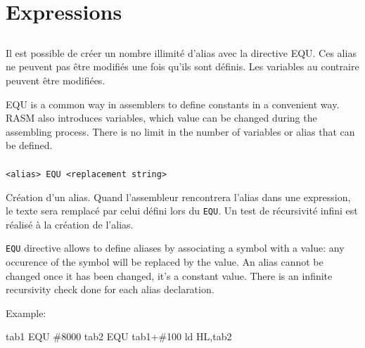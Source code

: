 \section{Expressions}

\subsection{}
\begin{xfr}
Il est possible de créer un nombre illimité d’alias avec la directive EQU.
Ces alias ne peuvent pas être modifiés une fois qu'ils sont définis.
Les variables au contraire peuvent être modifiées.
\end{xfr}

\begin{xen}
EQU is a common way in assemblers to define constants in a convenient way.  
RASM also introduces variables, which value can be changed during the assembling process.
There is no limit in the number of variables or alias that can be defined.
\end{xen}

\subsubsection{}
\begin{verbatim}
<alias> EQU <replacement string>
\end{verbatim}

\begin{xfr}
Création d'un alias. Quand l'assembleur rencontrera l'alias dans une expression, le texte sera remplacé par celui défini lors du \texttt{EQU}. 
Un test de récursivité infini est réalisé à la création de l'alias.
\end{xfr}

\begin{xen}
\texttt{EQU} directive allows to define aliases by associating a symbol with a value: any occurence of the symbol will be replaced by the value. An alias cannot be changed once it has been changed, it's a constant value.
There is an infinite recursivity check done for each alias declaration.
\end{xen}

Example:
\begin{code}
tab1 EQU \#8000
tab2 EQU tab1+\#100
ld HL,tab2
\end{code}


